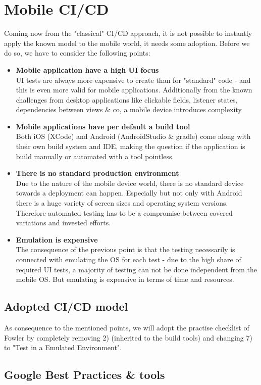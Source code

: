 \section{Mobile CI/CD}

Coming now from the "classical" CI/CD approach, it is not possible to instantly apply the known model to the mobile world, it needs some adoption. Before we do so, we have to consider the following points:

\begin{itemize}
	
	\item \textbf{Mobile application have a high UI focus} \\
	UI tests are always more expensive to create than for "standard" code - and this is even more valid for mobile applications. Additionally from the known challenges from desktop applications like clickable fields, listener states, dependencies between views \& co, a mobile device introduces complexity
	\\
	
	\item \textbf{Mobile applications have per default a build tool} \\
	Both iOS (XCode) and Android (AndroidStudio \& gradle) come along with their own build system and IDE, making the question if the application is build manually or automated with a tool pointless.
	\\
	
	\item \textbf{There is no standard production environment} \\
	Due to the nature of the mobile device world, there is no standard device towards a deployment can happen. Especially but not only with Android there is a huge variety of screen sizes and operating system versions. Therefore automated testing has to be a compromise between covered variations and invested efforts. 
	\\
	
	\item \textbf{Emulation is expensive} \\
	The consequence of the previous point is that the testing necessarily is connected with emulating the OS for each test - due to the high share of required UI tests, a majority of testing can not be done independent from the mobile OS. But emulating is expensive in terms of time and resources.
	
\end{itemize}

\subsection{Adopted CI/CD model}
As consequence to the mentioned points, we will adopt the practise checklist of Fowler by completely removing 2) (inherited to the build tools) and changing 7) to "Test in a Emulated Environment".

\subsection{Google Best Practices \& tools}